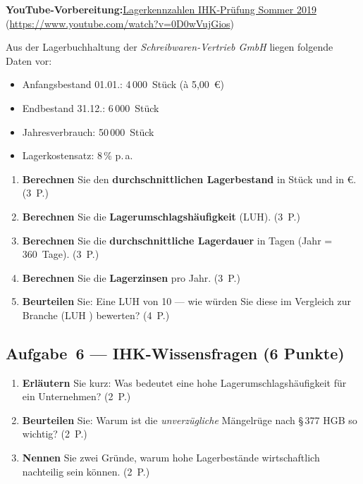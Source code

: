 \documentclass[11pt, a4paper]{article}
\begin{document}
\noindent\textbf{\color{bfwAccent}YouTube-Vorbereitung:}\enspace \href{https://www.youtube.com/watch?v=0D0wVujGios}{Lagerkennzahlen IHK-Prüfung Sommer 2019} (\url{https://www.youtube.com/watch?v=0D0wVujGios})

\medskip
Aus der Lagerbuchhaltung der \emph{Schreibwaren-Vertrieb GmbH} liegen folgende Daten vor:

\begin{itemize}[itemsep=0pt]
  \item Anfangsbestand 01.01.: 4\,000~Stück (à 5,00~€)
  \item Endbestand 31.12.: 6\,000~Stück
  \item Jahresverbrauch: 50\,000~Stück
  \item Lagerkostensatz: 8\,\% p.\,a.
\end{itemize}

\begin{enumerate}[label=(\alph*)]
  \item \textbf{Berechnen} Sie den \textbf{durchschnittlichen Lagerbestand} in Stück und in €. \hfill (3~P.)
  \item \textbf{Berechnen} Sie die \textbf{Lagerumschlagshäufigkeit} (LUH). \hfill (3~P.)
  \item \textbf{Berechnen} Sie die \textbf{durchschnittliche Lagerdauer} in Tagen (Jahr = 360~Tage). \hfill (3~P.)
  \item \textbf{Berechnen} Sie die \textbf{Lagerzinsen} pro Jahr. \hfill (3~P.)
  \item \textbf{Beurteilen} Sie: Eine LUH von 10 --- wie würden Sie diese im Vergleich zur Branche (LUH ) bewerten? \hfill (4~P.)
\end{enumerate}

\subsection*{Aufgabe~6 --- IHK-Wissensfragen (6 Punkte)}

\begin{enumerate}[label=(\alph*)]
  \item \textbf{Erläutern} Sie kurz: Was bedeutet eine hohe Lagerumschlagshäufigkeit für ein Unternehmen? \hfill (2~P.)
  \item \textbf{Beurteilen} Sie: Warum ist die \emph{unverzügliche} Mängelrüge nach §\,377 HGB so wichtig? \hfill (2~P.)
  \item \textbf{Nennen} Sie zwei Gründe, warum hohe Lagerbestände wirtschaftlich nachteilig sein können. \hfill (2~P.)
\end{enumerate}
\end{document}
